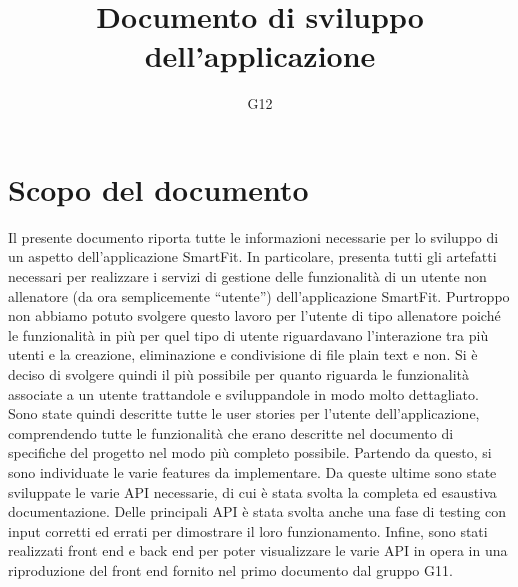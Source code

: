 \documentclass{article}
\author{G12}
\title{Documento di sviluppo dell’applicazione}
\date{}
\begin{document}
   \maketitle 
   \tableofcontents
   \clearpage
   \section{Scopo del documento}
   Il presente documento riporta tutte le informazioni necessarie per lo sviluppo di un aspetto dell'applicazione SmartFit. In particolare, presenta tutti gli artefatti necessari per realizzare i servizi di gestione delle funzionalità di un utente non allenatore (da ora semplicemente “utente”) dell’applicazione SmartFit. 
   Purtroppo non abbiamo potuto svolgere questo lavoro per l’utente di tipo allenatore poiché le funzionalità in più per quel tipo di utente riguardavano l’interazione tra più utenti e la creazione, eliminazione e condivisione di file plain text e non. Si è deciso di svolgere quindi il più possibile per quanto riguarda le funzionalità associate a un utente trattandole e sviluppandole in modo molto dettagliato.\\
   Sono state quindi descritte tutte le user stories per l’utente dell’applicazione, comprendendo tutte le funzionalità che erano descritte nel documento di specifiche del progetto nel modo più completo possibile. Partendo da questo, si sono individuate le varie features da implementare. Da queste ultime sono state sviluppate le varie API necessarie, di cui è stata svolta la completa ed esaustiva documentazione. Delle principali API è stata svolta anche una fase di testing con input corretti ed errati per dimostrare il loro funzionamento. Infine, sono stati realizzati front end e back end per poter visualizzare le varie API in opera in una riproduzione del front end fornito nel primo documento dal gruppo G11.
\end{document}
